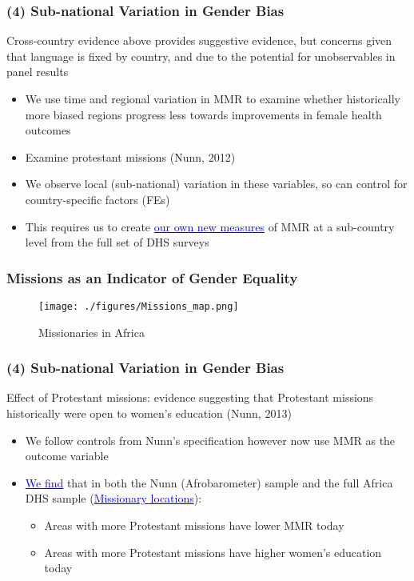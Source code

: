 \documentclass[10pt,letterpaper,subeqn]{beamer}
\begin{document}
\begin{frame}[label=MMRSub]
\frametitle{(4) Sub-national Variation in Gender Bias}
Cross-country evidence above provides suggestive evidence, but concerns given
that language is fixed by country, and due to the potential for unobservables in panel 
results
\vspace{5mm}
\begin{itemize}
\setlength{\itemsep}{10pt}
  \item We use time and regional variation in MMR to examine whether historically
        more biased regions progress less towards improvements in female health
        outcomes
  \item Examine protestant missions (Nunn, 2012)
  \item We observe local (sub-national) variation in these variables, so can
    control for country-specific factors (FEs)
  \item This requires us to create \hyperlink{MMRcompar}{\textcolor{blue}{our own
      new measures}} of MMR at a sub-country level from the full set of DHS surveys
\end{itemize}
\end{frame}

\begin{frame}[label=MissionsMap]
\frametitle{Missions as an Indicator of Gender Equality}
%
\begin{figure}[h!]
\centering
\texttt{[image: ./figures/Missions\_map.png]}
\caption{Missionaries in Africa }
\end{figure}
\vspace{1cm}

\end{frame}

\begin{frame}[label=missions]
\frametitle{(4) Sub-national Variation in Gender Bias}
Effect of Protestant missions: evidence suggesting that 
Protestant missions historically were open to women's education (Nunn, 2013) %
\vspace{4mm}
\begin{itemize}
\setlength{\itemsep}{10pt}
\item We follow controls from Nunn's specification however now use MMR as the
  outcome variable
\item \hyperlink{MissionsTab}{\textcolor{blue}{We find}} that in both the 
      Nunn (Afrobarometer) sample and the full Africa DHS sample (\hyperlink{MissionsMap}{\textcolor{blue}{Missionary locations}}):
\begin{itemize}
\item Areas with more Protestant missions have lower MMR today
\item Areas with more Protestant missions have higher women's education today
\end{itemize}
\end{itemize}
\end{frame}
\end{document}
